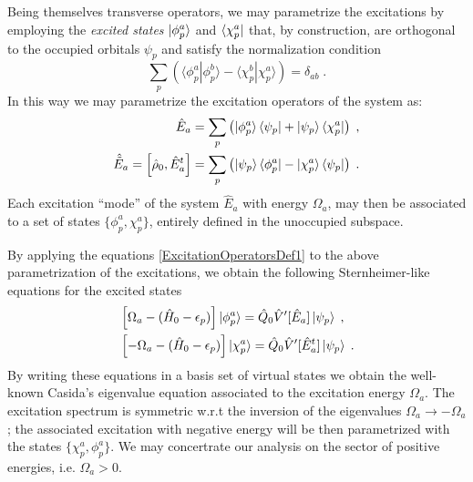 \documentclass[reprint,aps,prb]{revtex4-1}
\newcommand{\eps}{\epsilon}
\newcommand{\be}{\begin{equation}}
\newcommand{\ee}{\end{equation}}
\newcommand{\nn}{\notag}
\newcommand{\lb}{\label}
\newcommand{\op}[1]{\hat {#1}}
\newcommand{\sop}[1]{\op{\op {#1}}}
\newcommand{\commutator}[2]{\left[ {#1} , {#2} \right]}
\newcommand{\brket}[2]{\langle  #1 | #2 \rangle} %
\newcommand{\dmnot}{\op{\rho}_0}
\newcommand{\hnot}{\op{H}_0}
\newcommand{\Liouv}{\sop{\mathcal L}}
\begin{document}
Being themselves transverse operators, we may parametrize the excitations by employing  
the \emph{excited states} $\ket{\phi^a_p}$ and $\bra{\chi^a_p}$ that, by construction, are orthogonal to the occupied orbitals
$\psi_p$ and satisfy the normalization condition %
\be\lb{ExcitedStateOrthNormDef1}
\sum_p \left(\brket{\phi_p^a}{\phi_p^b} - \brket{\chi_p^b}{\chi_p^a}\right) = \delta_{ab} \;. 
\ee
In this way we may parametrize the excitation operators of the system as:
\begin{align}\lb{ExcitationOperatorsDef2}
\op E_a &= \sum_p \left( \ket{\phi^a_p}\bra{\psi_p} + \ket{\psi_p} \bra{\chi^a_p}\right)\;, \nn \\
\op{\tilde E}_a = \commutator{\dmnot}{\op E^t_a} &= \sum_p \left( \ket{\psi_p}\bra{\phi^a_p} - \ket{\chi^a_p} \bra{\psi_p}\right)\;.
\end{align}
Each excitation ``mode'' of the system $\op E_a$ with energy $\Omega_a$,
may then be associated to a set of states $\{\phi^a_p,\chi^a_p\}$,
entirely defined in the unoccupied subspace.

By applying the equations \eqref{ExcitationOperatorsDef1} to the above parametrization
of the excitations, we obtain the following Sternheimer-like equations for the excited states 
\begin{align}\lb{ExcitationOperatorsDef3}
&\left[\Omega_a-(\hnot - \eps_p)\right] \ket{\phi_p^a} = \op Q_0 \op V'[\op E_a] \ket{\psi_p} \;, \nn\\
&\left[-\Omega_a-(\hnot - \eps_p)\right]\ket{\chi_p^a} = \op Q_0\op V'[\op E^t_a]\ket{\psi_p}  \;.
\end{align}
By writing these equations in a basis set of virtual states we obtain the well-known Casida's eigenvalue equation
associated to the excitation energy $\Omega_a$.
The excitation spectrum is symmetric w.r.t the inversion of the eigenvalues 
$\Omega_a \rightarrow -\Omega_a$; the associated excitation with negative energy will
be then parametrized with the states $\{\chi^a_p,\phi^a_p\}$.
We may concertrate our analysis on the sector of positive energies, i.e. $\Omega_a > 0$.
\end{document}
